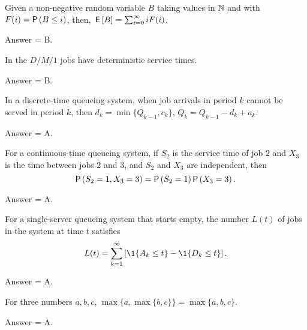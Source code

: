 \begin{exercise}[201802]
Given a non-negative random variable $B$ taking values in $\mathbb{N}$ and with $F(i) = \P{B\leq i}$, 
then, $\,\mathsf{E}\left[B\right] = \sum_{i=0}^\infty i F(i)$.
\begin{solution}
Answer = B.
\end{solution}
\end{exercise}

\begin{exercise}[201802]
In the $D/M/1$ jobs have deterministic service times.
\begin{solution}
Answer = B.
\end{solution}
\end{exercise}

\begin{exercise}[201802]
In a discrete-time queueing system, when job arrivals in period $k$ cannot be served in period $k$, then $d_k = \min\{Q_{k-1}, c_k\}$, $Q_k = Q_{k-1} -d_k + a_k.$
\begin{solution}
Answer = A.
\end{solution}
\end{exercise}

\begin{exercise}[201802]
For a continuous-time queueing system, if $S_2$ is the service time of job $2$ and $X_3$ is the time between jobs 2 and 3, and $S_2$ and $X_3$ are independent, then
\begin{equation*}
 \P{S_{2}=1, X_3=3} = \P{S_{2}=1}\P{X_3=3}.
\end{equation*}
\begin{solution}
Answer = A.
\end{solution}
\end{exercise}

\begin{exercise}[201802]
For a single-server queueing system that starts empty, the number $L(t)$ of jobs in the system at time $t$ satisfies
 \begin{equation*}
 L(t) = \sum_{k=1}^\infty \left[\1{A_k \leq t} - \1{D_k \leq t}\right].
 \end{equation*}
\begin{solution}
Answer = A.
\end{solution}
\end{exercise}


\begin{exercise}[201802]
For three numbers $a,b,c$, $\max\{a, \max\{b, c\}\} = \max\{a, b, c\}$. 
\begin{solution}
Answer = A.
\end{solution}
\end{exercise}

